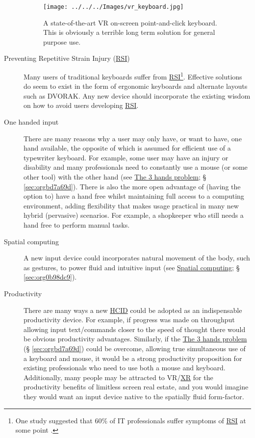 \documentclass[logo,bsc,singlespacing,parskip]{infthesis}
\begin{document}
\begin{description}
\begin{figure}[h]
\centering
\texttt{[image: ../../../Images/vr\_keyboard.jpg]}
\caption[VR point-and-click on-screen keybaord]{\label{fig:virtual_keyboard}A state-of-the-art VR on-screen point-and-click keyboard. This is obviously a terrible long term solution for general purpose use.}
\end{figure}
\item[{Preventing Repetitive Strain Injury (\hyperref[orgc186d45]{RSI})}] Many users of traditional keyboards suffer from \hyperref[orgc186d45]{RSI}\footnote{One study suggested that 60\% of IT professionals suffer symptoms of \hyperref[orgc186d45]{RSI} at some point \autocite{namayandegiEVALUATIONMETHODWHICH2015}.}.
Effective solutions do seem to exist in the form of ergonomic keyboards and alternate layouts such as DVORAK.
Any new device should incorporate the existing wisdom on how to avoid users developing \hyperref[orgc186d45]{RSI}.

\item[{One handed input}] There are many reasons why a user may only have, or want to have, one hand available, the opposite of which is assumed for efficient use of a typewriter keyboard.
For example, some user may have an injury or disability and many professionals need to constantly use a mouse (or some other tool) with the other hand (see \hyperref[sec:orgbd7a69d]{The 3 hands problem}; § \ref{sec:orgbd7a69d}).
There is also the more open advantage of (having the option to) have a hand free whilst maintaining full access to a computing environment, adding flexibility that makes usage practical in many new hybrid (pervasive) scenarios.
For example, a shopkeeper who still needs a hand free to perform manual tasks.

\item[{Spatial computing}] A new input device could incorporates natural movement of the body, such as gestures, to power fluid and intuitive input (see \hyperref[sec:org5dcb1c3]{Spatial computing}; § \ref{sec:org0b98dc9}).

\item[{Productivity}] There are many ways a new \hyperref[org30e2275]{HCID} could be adopted as an indispensable productivity device.
For example, if progress was made on throughput allowing input text/commands closer to the speed of thought there would be obvious productivity advantages.
Similarly, if the \hyperref[sec:orgbd7a69d]{The 3 hands problem} (§ \ref{sec:orgbd7a69d}) could be overcome, allowing true simultaneous use of a keyboard and mouse, it would be a strong productivity proposition for existing professionals who need to use both a mouse and keyboard.
Additionally, many people may be attracted to VR/\hyperref[orgf7f8e78]{XR} for the productivity benefits of limitless screen real estate, and you would imagine they would want an input device native to the spatially fluid form-factor.
\end{description}
\end{document}
